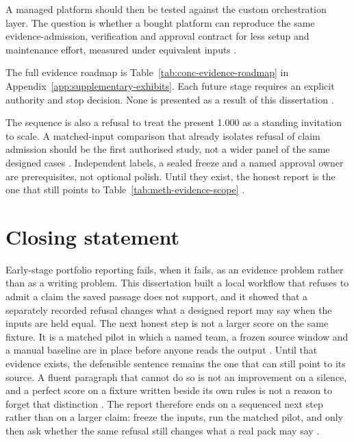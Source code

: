 A managed platform should then be tested against the custom orchestration layer. The question is
whether a bought platform can reproduce the same evidence-admission, verification and approval
contract for less setup and maintenance effort, measured under equivalent inputs
\citep{spacexai2026grokbot,fu2026agents,pineau2021reproducibility}.

The full evidence roadmap is Table~\ref{tab:conc-evidence-roadmap} in
Appendix~\ref{app:supplementary-exhibits}. Each future stage requires an explicit authority and stop
decision. None is presented as a result of this dissertation
\citep{nist2023airmf,pineau2021reproducibility}.

The sequence is also a refusal to treat the present 1.000 as a standing invitation to scale. A
matched-input comparison that already isolates refusal of claim admission should be the first
authorised study, not a wider panel of the same designed cases \citep{fu2026agents,ribeiro2020checklist}.
Independent labels, a sealed freeze and a named approval owner are prerequisites, not optional
polish. Until they exist, the honest report is the one that still points to
Table~\ref{tab:meth-evidence-scope} \citep{kapoor2023leakage,pineau2021reproducibility}.

\section{Closing statement}

Early-stage portfolio reporting fails, when it fails, as an evidence problem rather than as a writing
problem. This dissertation built a local workflow that refuses to admit a claim the saved passage
does not support, and it showed that a separately recorded refusal changes what a designed report
may say when the inputs are held equal. The next honest step is not a larger score on the same
fixture. It is a matched pilot in which a named team, a frozen source window and a manual baseline
are in place before anyone reads the output \citep{hevner2004design,peffers2007dsrm}. Until that
evidence exists, the defensible sentence remains the one that can still point to its source. A
fluent paragraph that cannot do so is not an improvement on a silence, and a perfect score on a
fixture written beside its own rules is not a reason to forget that distinction
\citep{thorat2024summexecedit,ribeiro2020checklist}. The report therefore ends on a sequenced next
step rather than on a larger claim: freeze the inputs, run the matched pilot, and only then ask
whether the same refusal still changes what a real pack may say
\citep{peffers2007dsrm,kapoor2023leakage}.
